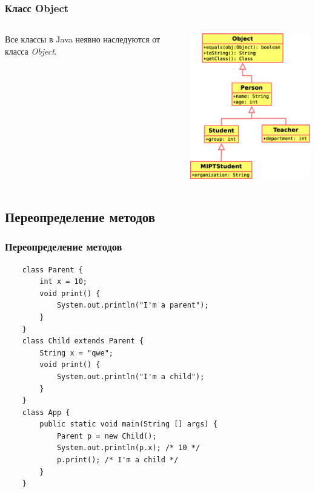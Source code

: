 \begin{frame}[fragile]
	\frametitle{Класс Object}

	\begin{columns}[c]
	\column{2.0in}
	\begin{Large}
	Все классы в Java неявно наследуются от класса \emph{Object}.
	\end{Large}
	\bigskip

	\column{2.45in}
	\includegraphics[width=2.5in]{lesson-4-Diagram4.eps}
	\end{columns}
\end{frame}


\subsection{Переопределение методов}
\begin{frame}[fragile]
	\frametitle{Переопределение методов}

	\begin{verbatim}
	class Parent {
	    int x = 10;
	    void print() {
	        System.out.println("I'm a parent");
	    }
	}
	class Child extends Parent {
	    String x = "qwe";
	    void print() {
	        System.out.println("I'm a child");
	    }
	}
	class App {
	    public static void main(String [] args) {
	        Parent p = new Child();
	        System.out.println(p.x); /* 10 */
	        p.print(); /* I'm a child */
	    }
	}
	\end{verbatim}
\end{frame}

